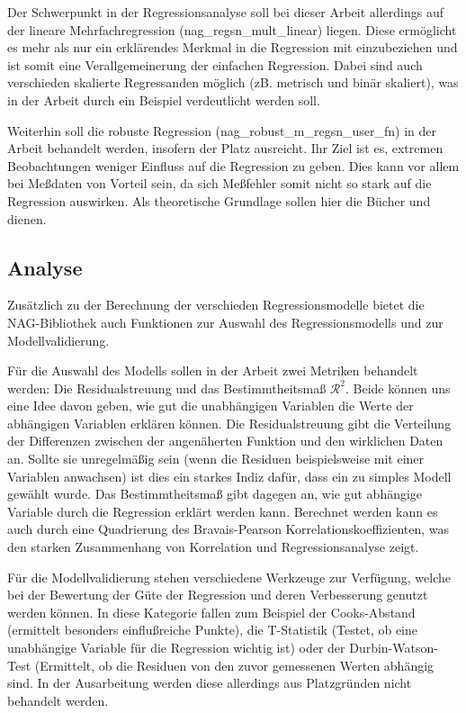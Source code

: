 \documentclass{article}
\begin{document}
Der Schwerpunkt in der Regressionsanalyse soll bei dieser Arbeit allerdings auf der lineare Mehrfachregression (nag\_regsn\_mult\_linear) liegen.
Diese ermöglicht es mehr als nur ein erklärendes Merkmal in die Regression mit einzubeziehen und ist somit eine Verallgemeinerung der einfachen Regression.
Dabei sind auch verschieden skalierte Regressanden möglich (zB. metrisch und binär skaliert), was in der Arbeit durch ein Beispiel verdeutlicht werden soll.

Weiterhin soll die robuste Regression (nag\_robust\_m\_regsn\_user\_fn) in der Arbeit behandelt werden, insofern der Platz ausreicht.
Ihr Ziel ist es, extremen Beobachtungen weniger Einfluss auf die Regression zu geben.
Dies kann vor allem bei Meßdaten von Vorteil sein, da sich Meßfehler somit nicht so stark auf die Regression auswirken.
Als theoretische Grundlage sollen hier die Bücher \cite{Hampel1986} und \cite{Huber1981} dienen.


\subsection{Analyse}

Zusätzlich zu der Berechnung der verschieden Regressionsmodelle bietet die NAG-Bibliothek auch Funktionen zur Auswahl des Regressionsmodells und zur Modellvalidierung.

Für die Auswahl des Modells sollen in der Arbeit zwei Metriken behandelt werden: Die Residualstreuung und das Bestimmtheitsmaß $\mathcal{R}^2$.
Beide können uns eine Idee davon geben, wie gut die unabhängigen Variablen die Werte der abhängigen Variablen erklären können.
Die Residualstreuung gibt die Verteilung der Differenzen zwischen der angenäherten Funktion und den wirklichen Daten an.
Sollte sie unregelmäßig sein (wenn die Residuen beispielsweise mit einer Variablen anwachsen) ist dies ein starkes Indiz dafür, dass ein zu simples Modell gewählt wurde. 
Das Bestimmtheitsmaß gibt dagegen an, wie gut abhängige Variable durch die Regression erklärt werden kann.
Berechnet werden kann es auch durch eine Quadrierung des Bravais-Pearson Korrelationskoeffizienten, was den starken Zusammenhang von Korrelation und Regressionsanalyse zeigt.

Für die Modellvalidierung stehen verschiedene Werkzeuge zur Verfügung, welche bei der Bewertung der Güte der Regression und deren Verbesserung genutzt werden können.
In diese Kategorie fallen zum Beispiel der Cooks-Abstand (ermittelt besonders einflußreiche Punkte), die T-Statistik (Testet, ob eine unabhängige Variable für die Regression wichtig ist) oder der Durbin-Watson-Test (Ermittelt, ob die Residuen von den zuvor gemessenen Werten abhängig sind.
In der Ausarbeitung werden diese allerdings aus Platzgründen nicht behandelt werden.
\end{document}
